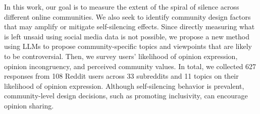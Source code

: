 In this work, our goal is to measure the extent of the spiral of silence across different online communities. We also seek to identify community design factors that may amplify or mitigate self-silencing effects. Since directly measuring what is left unsaid using social media data is not possible, we propose a new method using LLMs to propose community-specific topics and viewpoints that are likely to be controversial. Then, we survey users' likelihood of opinion expression, opinion incongruency, and perceived community values. In total, we collected 627 responses from 108 Reddit users across 33 subreddits and 11 topics on their likelihood of opinion expression. Although self-silencing behavior is prevalent, community-level design decisions, such as promoting inclusivity, can encourage opinion sharing. 